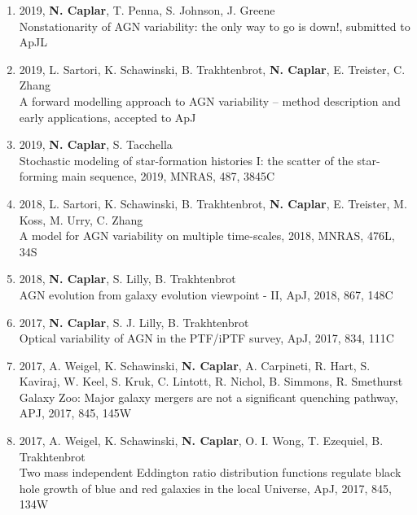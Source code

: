 \documentclass[11pt,letterpaper]{article}
\begin{document}
\begin{enumerate}



\item 2019, \textbf{N. Caplar}, T. Penna, S. Johnson, J. Greene \\
Nonstationarity of AGN variability: the only way to go is down!, submitted to ApJL\\

\item 2019, L. Sartori, K. Schawinski, B. Trakhtenbrot, \textbf{N. Caplar}, E. Treister, C. Zhang\\
A forward modelling approach to AGN variability – method
description and early applications, accepted to ApJ\\

\item 2019, \textbf{N. Caplar}, S. Tacchella \\
Stochastic modeling of star-formation histories I: the scatter of the star-forming main sequence, 2019, MNRAS, 487, 3845C\\


\item 2018, L. Sartori, K. Schawinski, B. Trakhtenbrot, \textbf{N. Caplar}, E. Treister, M. Koss, M. Urry, C. Zhang \\
A model for AGN variability on multiple time-scales, 2018, MNRAS, 476L, 34S\\

\item 2018, \textbf{N. Caplar}, S. Lilly, B. Trakhtenbrot\\
AGN evolution from galaxy evolution viewpoint - II, ApJ, 2018, 867, 148C\\

\item 2017,  \textbf{N. Caplar}, S. J. Lilly, B. Trakhtenbrot   \\Optical variability of AGN in the PTF/iPTF survey, ApJ, 2017, 834, 111C   \\

\item 2017, A. Weigel, K. Schawinski,  \textbf{N. Caplar}, A. Carpineti, R. Hart, S. Kaviraj, W. Keel, S. Kruk, C. Lintott, R. Nichol, B. Simmons, R. Smethurst
\\    Galaxy Zoo:  Major galaxy mergers are not a significant quenching pathway, APJ, 2017, 845, 145W \\

\item 2017, A. Weigel, K. Schawinski,  \textbf{N. Caplar}, O. I. Wong, T. Ezequiel, B. Trakhtenbrot
\\    Two mass independent Eddington ratio distribution functions regulate black hole growth of blue and red 
galaxies in the local Universe, ApJ, 2017, 845, 134W \\



\end{enumerate}
\end{document}

